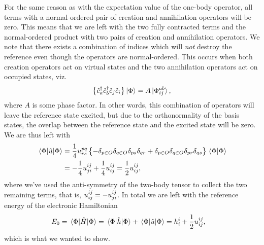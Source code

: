         For the same reason as with the expectation value of the one-body
        operator, all terms with a normal-ordered pair of creation and
        annihilation operators will be zero.
        This means that we are left with the two fully contracted terms and the
        normal-ordered product with two pairs of creation and annihilation
        operators.
        We note that there exists a combination of indices which will \emph{not}
        destroy the reference even though the operators are normal-ordered.
        This occurs when both creation operators act on virtual states and the
        two annihilation operators act on occupied states, viz.
        \begin{align}
            \bigl\{ 
                {\hat{c}_{a}^{\dagger}}
                {\hat{c}_{b}^{\dagger}}
                {\hat{c}_{j}}
                {\hat{c}_{i}}
             \bigr\}
            \ket*{\Phi}
            = A\ket*{\Phi^{ab}_{ij}},
        \end{align}
        where $A$ is some phase factor.
        In other words, this combination of operators will leave the reference
        state excited, but due to the orthonormality of the basis states, the
        overlap between the reference state and the excited state will be zero.
        We are thus left with
        \begin{align}
            \mel*{\Phi}{\hat{u}}{\Phi}
            &=
            \frac{1}{4}u^{pq}_{rs}\left\{ 
                -\delta_{p \in O}
                \delta_{q \in O}
                \delta_{ps}
                \delta_{qr}
                + \delta_{p \in O}
                \delta_{q \in O}
                \delta_{pr}
                \delta_{qs}
             \right\}\braket*{\Phi}{\Phi}
            \\
            &=
            -\frac{1}{4} u^{ij}_{ji}
            + \frac{1}{4} u^{ij}_{ij}
            = \frac{1}{2} u^{ij}_{ij},
        \end{align}
        where we've used the anti-symmetry of the two-body tensor to collect the
        two remaining terms, that is, $u^{ij}_{ij} =-u^{ij}_{ji}$.
        In total we are left with the reference energy of the electronic
        Hamiltonian
        \begin{align}
            E_{0}
            &=
            \mel*{\Phi}{\hat{H}}{\Phi}
            =
            \mel*{\Phi}{\hat{h}}{\Phi}
            + \mel*{\Phi}{\hat{u}}{\Phi}
            =
            h^{i}_{i}
            + \frac{1}{2} u^{ij}_{ij},
        \end{align}
        which is what we wanted to show.

